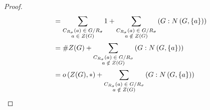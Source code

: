 \documentclass[dvipdfmx]{jsarticle}
\begin{document}
\begin{proof}
\begin{align*}
&= \sum_{\scriptsize \begin{matrix} C_{R_{\sigma}}(a) \in {G}/{R_{\sigma}} \\a \in Z(G) \end{matrix}} 1 + \sum_{\scriptsize \begin{matrix} C_{R_{\sigma}}(a) \in {G}/{R_{\sigma}} \\a \notin Z(G) \end{matrix}} \left( G:N\left( G,\left\{ a \right\} \right) \right)\\
&= \#{Z(G)} + \sum_{\scriptsize \begin{matrix} C_{R_{\sigma}}(a) \in {G}/{R_{\sigma}} \\a \notin Z(G) \end{matrix}} \left( G:N\left( G,\left\{ a \right\} \right) \right)\\
&= o\left( Z(G),* \right) + \sum_{\scriptsize \begin{matrix} C_{R_{\sigma}}(a) \in {G}/{R_{\sigma}} \\a \notin Z(G) \end{matrix}} \left( G:N\left( G,\left\{ a \right\} \right) \right)
\end{align*}
\end{proof}
\end{document}
